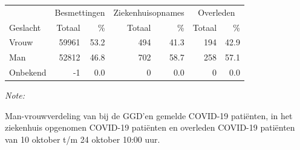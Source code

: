 \documentclass[
  english,
  man,floatsintext]{apa6}
\begin{document}
\begin{table}[H]
\centering\begingroup\fontsize{11}{13}\selectfont

\begin{threeparttable}
\begin{tabular}{lrrrrrr}
\toprule
\multicolumn{1}{c}{ } & \multicolumn{2}{c}{Besmettingen} & \multicolumn{2}{c}{Ziekenhuisopnames} & \multicolumn{2}{c}{Overleden} \\
\cmidrule(l{3pt}r{3pt}){2-3} \cmidrule(l{3pt}r{3pt}){4-5} \cmidrule(l{3pt}r{3pt}){6-7}
Geslacht & Totaal & \% & Totaal & \% & Totaal & \%\\
\midrule
Vrouw & 59961 & 53.2 & 494 & 41.3 & 194 & 42.9\\
Man & 52812 & 46.8 & 702 & 58.7 & 258 & 57.1\\
Onbekend & -1 & 0.0 & 0 & 0.0 & 0 & 0.0\\
\bottomrule
\end{tabular}
\begin{tablenotes}
\item \textit{Note: } 
\item Man-vrouwverdeling van bij de GGD’en gemelde COVID-19 patiënten, in het ziekenhuis opgenomen COVID-19 patiënten en overleden COVID-19 patiënten van 10 oktober t/m 24 oktober 10:00 uur.
\end{tablenotes}
\end{threeparttable}
\endgroup{}
\end{table}
\newpage
\end{document}
